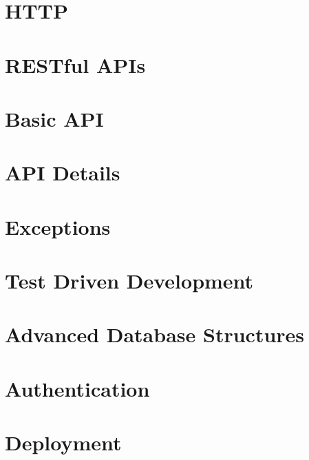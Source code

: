 \documentclass[b5paper,openany]{book}
\begin{document}
\tp


\tableofcontents



\chapter{HTTP}


\chapter{RESTful APIs}


\chapter{Basic API}


\chapter{API Details}


\chapter{Exceptions}


\chapter{Test Driven Development}


\chapter{Advanced Database Structures}


\chapter{Authentication}


\chapter{Deployment}






\end{document}
